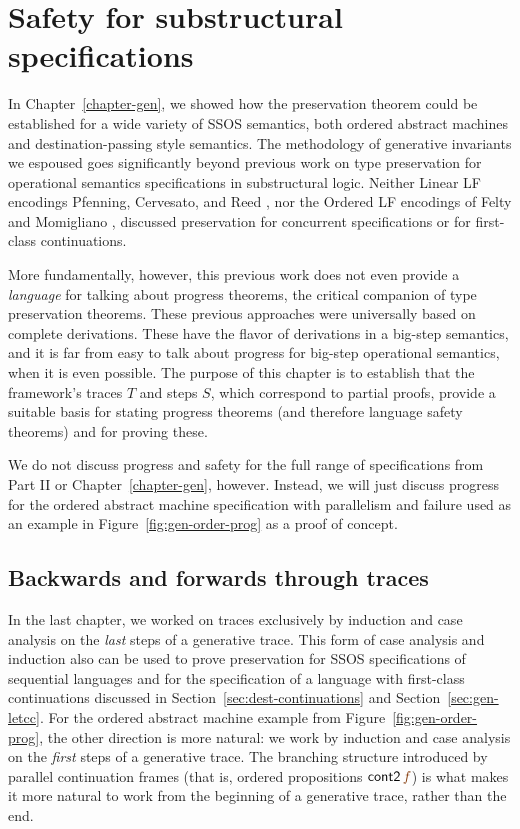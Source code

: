 \chapter{Safety for substructural specifications}
\label{chapter-safety}

In Chapter~\ref{chapter-gen}, we showed how the preservation theorem
could be established for a wide variety of SSOS semantics, both
ordered abstract machines and destination-passing style semantics.
The methodology of generative invariants we espoused goes
significantly beyond previous work on type preservation for
operational semantics specifications in substructural logic.  Neither
Linear LF encodings Pfenning, Cervesato, and Reed
\cite{cervesato02linear,reed09hybrid}, nor the Ordered LF encodings of
Felty and Momigliano \cite{felty12hybrid}, discussed preservation for
concurrent specifications or for first-class continuations. 

More fundamentally, however, this previous work does not even provide
a {\it language} for talking about progress theorems, the critical
companion of type preservation theorems.  These previous approaches
were universally based on complete derivations. These have the flavor
of derivations in a big-step semantics, and it is far from easy to
talk about progress for big-step operational semantics, when it is
even possible. The purpose of this chapter is to establish that the
\sls framework's traces $T$ and steps $S$, which correspond to partial
proofs, provide a suitable basis for stating progress theorems (and
therefore language safety theorems) and for proving these. 

We do not discuss progress and safety for the full range of
specifications from Part II or Chapter~\ref{chapter-gen},
however. Instead, we will just discuss progress for the ordered
abstract machine specification with parallelism and failure used as an
example in Figure~\ref{fig:gen-order-prog} as a proof of concept.

\section{Backwards and forwards through traces}

In the last chapter, we worked on traces exclusively by induction and
case analysis on the {\it last} steps of a generative trace.  This
form of case analysis and induction also can be used to prove
preservation for SSOS specifications of sequential languages and for
the specification of a language with first-class continuations
discussed in Section~\ref{sec:dest-continuations} and
Section~\ref{sec:gen-letcc}. For the ordered abstract machine example
from Figure~\ref{fig:gen-order-prog}, the other direction is more
natural: we work by induction and case analysis on the {\it first}
steps of a generative trace. The branching structure introduced by
parallel continuation frames (that is, ordered propositions ${\sf
  cont2}\,\lf{f}$) is what makes it more natural to work from the
beginning of a generative trace, rather than the end.

